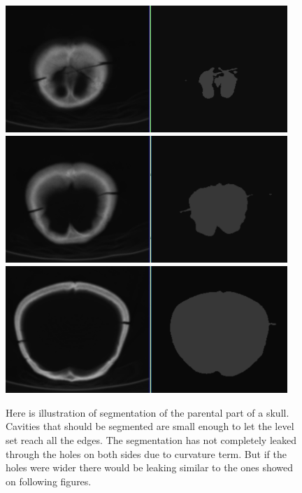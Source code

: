 \begin{figure}
    \centering
    \includegraphics[width=0.95\textwidth]{data/png/2}
    \includegraphics[width=0.95\textwidth]{data/png/4}
    \includegraphics[width=0.95\textwidth]{data/png/7}
    \caption[Result of segmentation of parietal part of a skull]
{
Here is illustration of segmentation of the parental part of a skull.
Cavities that should be segmented are small enough to let the level set reach all the edges.
The segmentation has not completely leaked through the holes on both sides due to curvature term.
But if the holes were wider there would be leaking similar to the ones showed on following figures.
}
    \label{fg:parietalSlicesSegmentation}
\end{figure}

